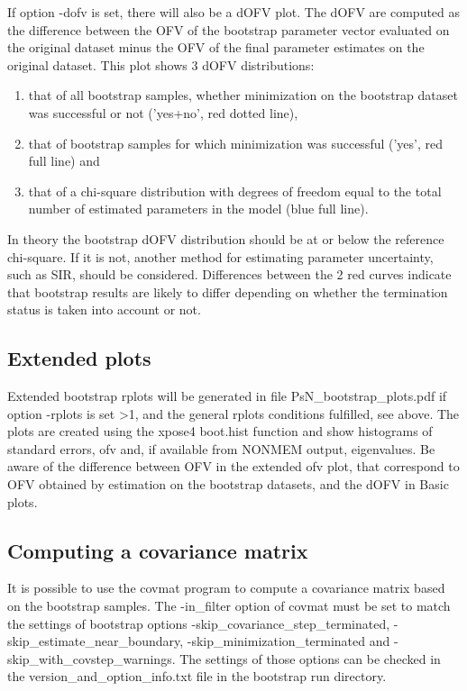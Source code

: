 If option -dofv is set, there will also be a dOFV plot.
The dOFV are computed as the difference between the OFV of the 
bootstrap parameter vector evaluated on the original dataset minus the OFV 
of the final parameter estimates on the original dataset. 
This plot shows 3 dOFV distributions:  
\begin{enumerate}
\item that of all bootstrap samples, whether minimization on the bootstrap dataset was successful or not ('yes+no', red dotted line), 
\item that of bootstrap samples for which minimization was successful ('yes', red full line) and 
\item that of a chi-square distribution with degrees of freedom equal to the total number of estimated parameters in the 
model (blue full line). 
\end{enumerate}
In theory the bootstrap dOFV distribution should be at or below the reference chi-square. If it is not, another method for estimating parameter uncertainty, such as SIR, should be considered. Differences between the 2 red curves indicate that bootstrap results are likely to differ depending on whether the termination status is taken into account or not. 

\subsection{Extended plots}
Extended bootstrap rplots will be generated in file PsN\_bootstrap\_plots.pdf
if option -rplots is set >1,
and the general rplots conditions fulfilled, see above.
The plots are created using the xpose4 boot.hist function
and show histograms of standard errors, ofv and, if available
from NONMEM output, eigenvalues.
Be aware of the difference between OFV in the extended ofv plot,
that correspond to OFV obtained by estimation on the bootstrap datasets,
and the dOFV in Basic plots.


\subsection{Computing a covariance matrix}
It is possible to use the covmat program to compute a covariance matrix based on the bootstrap samples. The -in\_filter option of covmat must be set to match the settings of bootstrap options -skip\_covariance\_step\_terminated,
-skip\_estimate\_near\_boundary, -skip\_minimization\_terminated and
-skip\_with\_covstep\_warnings. The settings of those options can be checked in the version\_and\_option\_info.txt file in
the bootstrap run directory.

